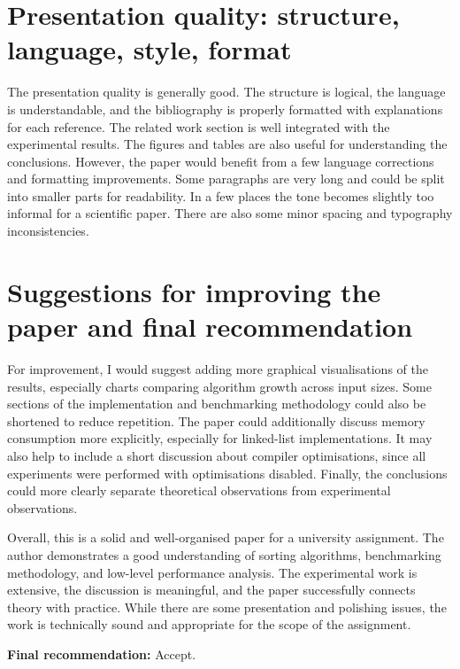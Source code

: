 \documentclass[11pt,a4paper]{article}
\begin{document}
\section{Presentation quality: structure, language, style, format}

The presentation quality is generally good. The structure is logical, the language is understandable, and the bibliography is properly formatted with explanations for each reference. The related work section is well integrated with the experimental results. The figures and tables are also useful for understanding the conclusions. However, the paper would benefit from a few language corrections and formatting improvements. Some paragraphs are very long and could be split into smaller parts for readability. In a few places the tone becomes slightly too informal for a scientific paper. There are also some minor spacing and typography inconsistencies.

\section{Suggestions for improving the paper and final recommendation}

For improvement, I would suggest adding more graphical visualisations of the results, especially charts comparing algorithm growth across input sizes. Some sections of the implementation and benchmarking methodology could also be shortened to reduce repetition. The paper could additionally discuss memory consumption more explicitly, especially for linked-list implementations. It may also help to include a short discussion about compiler optimisations, since all experiments were performed with optimisations disabled. Finally, the conclusions could more clearly separate theoretical observations from experimental observations.

Overall, this is a solid and well-organised paper for a university assignment. The author demonstrates a good understanding of sorting algorithms, benchmarking methodology, and low-level performance analysis. The experimental work is extensive, the discussion is meaningful, and the paper successfully connects theory with practice. While there are some presentation and polishing issues, the work is technically sound and appropriate for the scope of the assignment.

\vspace{1em}
\noindent\textbf{Final recommendation:} Accept.
\end{document}
